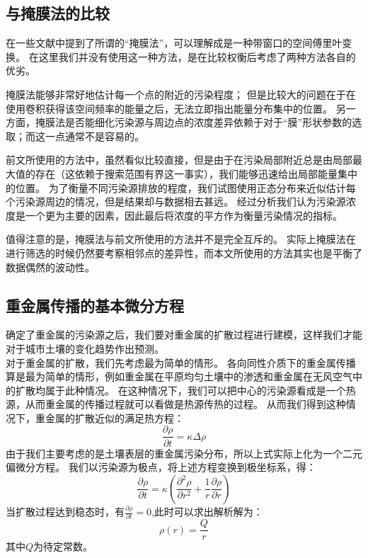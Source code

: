 \documentclass[a4paper]{article}
\begin{document}
\subsection{与掩膜法的比较}
在一些文献中提到了所谓的“掩膜法”，可以理解成是一种带窗口的空间傅里叶变换。
在这里我们并没有使用这一种方法，是在比较权衡后考虑了两种方法各自的优劣。

掩膜法能够非常好地估计每一个点的附近的污染程度；
但是比较大的问题在于在使用卷积获得该空间频率的能量之后，无法立即指出能量分布集中的位置。
另一方面，掩膜法是否能细化污染源与周边点的浓度差异依赖于对于“膜”形状参数的选取；而这一点通常不是容易的。

前文所使用的方法中，虽然看似比较直接，但是由于在污染局部附近总是由局部最大值的存在（这依赖于搜索范围有界这一事实），我们能够迅速给出局部能量集中的位置。
为了衡量不同污染源排放的程度，我们试图使用正态分布来近似估计每个污染源周边的情况，但是结果却与数据相去甚远。
经过分析我们认为污染源浓度是一个更为主要的因素，因此最后将浓度的平方作为衡量污染情况的指标。

值得注意的是，掩膜法与前文所使用的方法并不是完全互斥的。
实际上掩膜法在进行筛选的时候仍然要考察相邻点的差异性，而本文所使用的方法其实也是平衡了数据偶然的波动性。

\subsection{重金属传播的基本微分方程}
确定了重金属的污染源之后，我们要对重金属的扩散过程进行建模，这样我们才能对于城市土壤的变化趋势作出预测。  \\
\indent 对于重金属的扩散，我们先考虑最为简单的情形。
各向同性介质下的重金属传播算是最为简单的情形，例如重金属在平原均匀土壤中的渗透和重金属在无风空气中的扩散均属于此种情况。
在这种情况下，我们可以把中心的污染源看成是一个热源，从而重金属的传播过程就可以看做是热源传热的过程。
从而我们得到这种情况下，重金属的扩散近似的满足热方程：
\begin{equation}
\frac{\partial \rho}{\partial t} = \kappa \Delta \rho
\end{equation}
由于我们主要考虑的是土壤表层的重金属污染分布，所以上式实际上化为一个二元偏微分方程。
我们以污染源为极点，将上述方程变换到极坐标系，得：
\begin{equation}
\frac{\partial \rho}{\partial t} = \kappa(\frac{\partial^2 \rho}{\partial r^2}+\frac{1}{r}\frac{\partial \rho}{\partial r})
\end{equation}
当扩散过程达到稳态时，有$\frac{\partial \rho}{\partial t} = 0$,此时可以求出解析解为：
\begin{equation}
\rho(r) = \frac{Q}{r}
\end{equation}
其中$Q$为待定常数。\\
\end{document}
